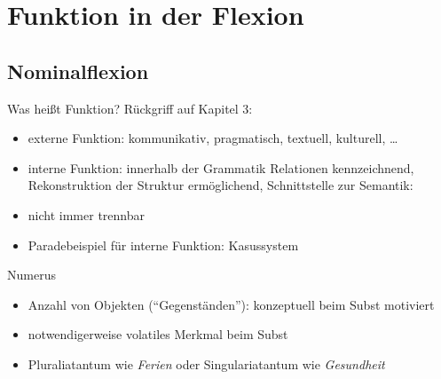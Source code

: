 \section{Funktion in der Flexion}

\subsection{Nominalflexion}

\begin{frame}
  {Was heißt Funktion?}
  \pause
  Rückgriff auf Kapitel 3:
  \pause
  \Halbzeile
  \begin{itemize}[<+->]
    \item \alert{externe} Funktion: kommunikativ, pragmatisch, textuell, kulturell, \dots
    \item \alert{interne} Funktion: innerhalb der Grammatik Relationen kennzeichnend,
      Rekonstruktion der Struktur ermöglichend, Schnittstelle zur Semantik: 
    \item nicht immer trennbar
      \Halbzeile
    \item Paradebeispiel für interne Funktion: \alert{Kasussystem}
  \end{itemize}
\end{frame}

\begin{frame}
  {Numerus}
  \pause
  \begin{exe}
    \ex
    \begin{xlist}
      \pause
    \end{xlist}
    \pause
    \ex
    \begin{xlist}
      \pause
    \end{xlist}
  \end{exe}
  \pause
  \Halbzeile
  \begin{itemize}[<+->]
    \item \alert{Anzahl von Objekten ("`Gegenständen"')}: konzeptuell beim Subst motiviert
    \item notwendigerweise volatiles Merkmal beim Subst
    \item Pluraliatantum wie \textit{Ferien} oder Singulariatantum wie \textit{Gesundheit}
  \end{itemize}
\end{frame}

